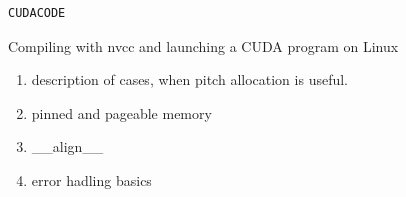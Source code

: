 \documentclass[12pt]{article}
\begin{document}
\begin{listing}[!ht]
\begin{verbatim}
CUDACODE
\end{verbatim}
\vspace{-0.7cm}
\caption{Compiling with nvcc and launching a CUDA program on Linux}
\label{nvcc_cuda}
\end{listing}


\begin{enumerate}
   \item description of cases, when pitch allocation is useful.
   \item pinned and pageable memory
\item \_\_align\_\_
\item error hadling basics   

\end{enumerate}

\printbibliography
   
\end{document}

